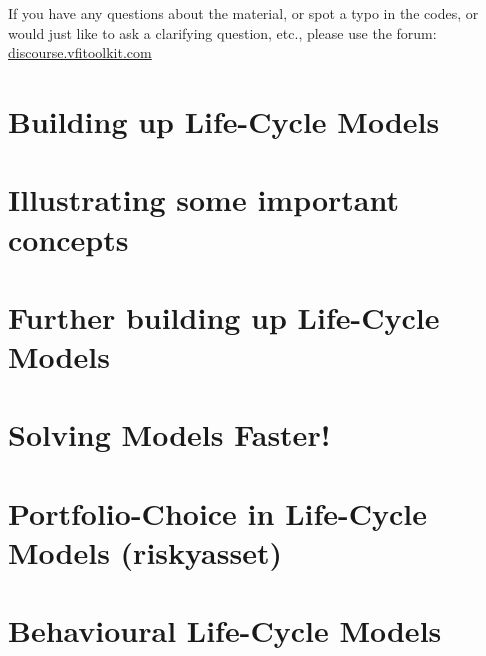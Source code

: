\documentclass[11pt]{article}%
\begin{document}
If you have any questions about the material, or spot a typo in the codes, or would just like to ask a clarifying question, etc., please use the forum: \href{http://discourse.vfitoolkit.com/}{discourse.vfitoolkit.com}

\newpage

\tableofcontents

\newpage

\newpage
\section{Building up Life-Cycle Models}







\newpage
\section{Illustrating some important concepts}


\newpage
\section{Further building up Life-Cycle Models}




\newpage
\section{Solving Models Faster!}


\newpage
\section{Portfolio-Choice in Life-Cycle Models (riskyasset)} \label{sec:portfoliochoice}


\newpage
\section{Behavioural Life-Cycle Models} \label{sec:behavioural}


\newpage
\end{document}
